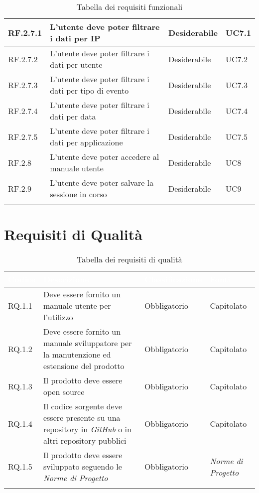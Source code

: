 \begin{center}
\begin{longtable}{|L{1,5cm}|C{5,5cm}|C{3cm}|C{2cm}|}
    RF.2.7.1 & L'utente deve poter filtrare i dati per IP & Desiderabile & UC7.1 \\ \hline
    RF.2.7.2 & L'utente deve poter filtrare i dati per utente & Desiderabile & UC7.2 \\ \hline
    RF.2.7.3 & L'utente deve poter filtrare i dati per tipo di evento & Desiderabile & UC7.3 \\ \hline
    RF.2.7.4 & L'utente deve poter filtrare i dati per data & Desiderabile & UC7.4 \\ \hline
    RF.2.7.5 & L'utente deve poter filtrare i dati per applicazione & Desiderabile & UC7.5 \\ \hline
    RF.2.8 & L'utente deve poter accedere al manuale utente & Desiderabile & UC8 \\ \hline
    RF.2.9 & L'utente deve poter salvare la sessione in corso & Desiderabile & UC9 \\ \hline

    \caption{Tabella dei requisiti funzionali}
  \end{longtable}
\end{center}

\section{Requisiti di Qualità}
\begin{center}
  \centering
  \begin{longtable}{|L{1,5cm}|C{5,5cm}|C{3cm}|C{2cm}|}
    \hline
    \textcolor[HTML]{FFFFFF}{\textbf{Codice}} & \textcolor[HTML]{FFFFFF}{\textbf{Descrizione}} & \textcolor[HTML]{FFFFFF}{\textbf{Classificazione}} & \textcolor[HTML]{FFFFFF}{\textbf{Fonti}}
    \\ \hline
    RQ.1.1 & Deve essere fornito un manuale utente per l'utilizzo & Obbligatorio & Capitolato \\ \hline
    RQ.1.2 & Deve essere fornito un manuale sviluppatore per la manutenzione ed estensione del prodotto & Obbligatorio & Capitolato \\ \hline
    RQ.1.3 & Il prodotto deve essere open source & Obbligatorio & Capitolato \\ \hline
    RQ.1.4 & Il codice sorgente deve essere presente su una repository in \textit{GitHub} o in altri repository pubblici & Obbligatorio & Capitolato \\ \hline
    RQ.1.5 & Il prodotto deve essere sviluppato seguendo le \textit{Norme di Progetto} & Obbligatorio & \textit{Norme di Progetto} \\ \hline

    \caption{Tabella dei requisiti di qualità}
  \end{longtable}
\end{center}

